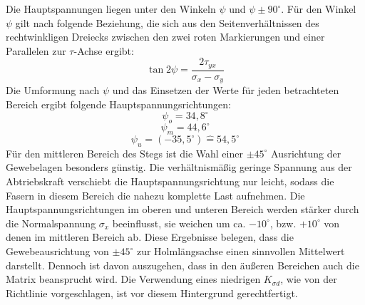 Die Hauptspannungen liegen unter den Winkeln $ \psi $ und $ \psi \pm 90^{\circ} $. Für den Winkel $ \psi $ gilt nach \cite{item16} folgende Beziehung, die sich aus den Seitenverhältnissen des rechtwinkligen Dreiecks zwischen den zwei roten Markierungen und einer Parallelen zur $ \tau $-Achse ergibt:
\begin{equation}
	\tan 2\psi=\frac{2\tau_{yx}}{\sigma_{x}-\sigma_{y}}
\end{equation}
Die Umformung nach $ \psi $ und das Einsetzen der Werte für jeden betrachteten Bereich ergibt folgende Hauptspannungsrichtungen:
\begin{equation}
	\psi_{o}=34,8^{\circ}
\end{equation}
\begin{equation}
	\psi_{m}=44,6^{\circ}
\end{equation}
\begin{equation}
	\psi_{u}=\left(-35,5^{\circ}\right)\hat{=}54,5^{\circ}
\end{equation}  
Für den mittleren Bereich des Stegs ist die Wahl einer $ \pm 45^{\circ} $ Ausrichtung der Gewebelagen besonders günstig. Die verhältnismäßig geringe Spannung aus der Abtriebskraft verschiebt die Hauptspannungsrichtung nur leicht, sodass die Fasern in diesem Bereich die nahezu komplette Last aufnehmen. Die Hauptspannungsrichtungen im oberen und unteren Bereich werden stärker durch die Normalspannung $ \sigma_{x} $ beeinflusst, sie weichen um ca. $ -10^{\circ} $, bzw. $ +10^{\circ} $ von denen im mittleren Bereich ab. Diese Ergebnisse belegen, dass die Gewebeausrichtung von $ \pm 45^{\circ} $ zur Holmlängsachse einen sinnvollen Mittelwert darstellt. Dennoch ist davon auszugehen, dass in den äußeren Bereichen auch die Matrix beansprucht wird. Die Verwendung eines niedrigen $ K_{\sigma d} $, wie von der Richtlinie vorgeschlagen, ist vor diesem Hintergrund gerechtfertigt.   